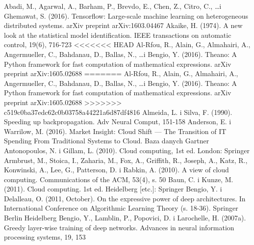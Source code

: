 \documentclass[12pt,a4paper,twoside]{article}
\begin{document}
\begin{thebibliography}{99}
\setlength{\itemsep}{0pt}%
 Abadi, M., Agarwal, A., Barham, P., Brevdo, E., Chen, Z., Citro, C., \ldots i Ghemawat, S. (2016). Tensorflow: Large-scale machine learning on heterogeneous distributed systems. arXiv preprint arXiv:1603.04467
 Akaike, H. (1974). A new look at the statistical model identification. IEEE transactions on automatic control, 19(6), 716-723
<<<<<<< HEAD
 Al-Rfou, R., Alain, G., Almahairi, A., Angermueller, C., Bahdanau, D., Ballas, N., \ldots i Bengio, Y. (2016). Theano: A Python framework for fast computation of mathematical expressions. arXiv preprint arXiv:1605.02688
=======
 Al-Rfou, R., Alain, G., Almahairi, A., Angermueller, C., Bahdanau, D., Ballas, N., \ldots i Bengio, Y. (2016). Theano: A Python framework for fast computation of mathematical expressions. arXiv preprint arXiv:1605.02688
>>>>>>> c519c0ba37edc62c0b03758a44221a6d87df4816
 Almeida, L. i Silva, F. (1990). Speeding up backpropagation. Adv Neural Comput, 151-158
 Anderson, E. i Warrilow, M. (2016). Market Insight: Cloud Shift — The Transition of IT Spending From Traditional Systems to Cloud. Baza danych Gartner
 Antonopoulos, N. i Gillam, L. (2010). Cloud computing, 1st ed. London: Springer
 Armbrust, M., Stoica, I., Zaharia, M., Fox, A., Griffith, R., Joseph, A., Katz, R., Konwinski, A., Lee, G., Patterson, D. i Rabkin, A. (2010). A view of cloud computing. Communications of the ACM, 53(4), s. 50
 Baun, C. i Kunze, M. (2011). Cloud computing. 1st ed. Heidelberg [etc.]: Springer
 Bengio, Y. i Delalleau, O. (2011, October). On the expressive power of deep architectures. In International Conference on Algorithmic Learning Theory (s. 18-36). Springer Berlin Heidelberg
 Bengio, Y., Lamblin, P., Popovici, D. i Larochelle, H. (2007a). Greedy layer-wise training of deep networks. Advances in neural information processing systems, 19, 153

\end{thebibliography}
\end{document}
